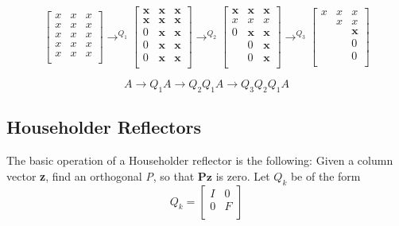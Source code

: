 \documentclass{article}
\begin{document}
$$
\left [\begin{array}{ccc}
x & x & x \\
x & x & x \\
x & x & x \\
x & x & x \\
x & x & x \\
\end{array}\right] \rightarrow^{Q_{1}} \left [\begin{array}{ccc}
\mathbf{x} & \mathbf{x} & \mathbf{x} \\
\mathbf{x} & \mathbf{x} & \mathbf{x} \\
0 & \mathbf{x} & \mathbf{x} \\
0 & \mathbf{x} & \mathbf{x} \\
0 & \mathbf{x} & \mathbf{x} \\
\end{array}\right]  \rightarrow^{Q_{2}} \left [\begin{array}{ccc}
\mathbf{x} & \mathbf{x} & \mathbf{x} \\
x & x & x \\
0 & \mathbf{x} & \mathbf{x} \\
 & 0 & \mathbf{x} \\
 & 0 & \mathbf{x} \\
\end{array}\right] \rightarrow^{Q_{3}} \left [\begin{array}{ccc}
x & x & x \\
  & x & x \\
 & & \mathbf{x} \\
 &  & 0 \\
 &  & 0 \\
\end{array}\right]
$$


$$ A \rightarrow  Q_{1}A \rightarrow Q_{2}Q_{1}A \rightarrow Q_{3}Q_{2}Q_{1}A$$


\subsection{Householder Reflectors}
The basic operation of a Householder reflector is the following: Given a column vector \textbf{z}, find an orthogonal \textit{P}, so that $\mathbf{Pz}$ is zero.
Let $Q_{k}$ be of the form
$$
Q_{k}= \left [\begin{array}{cc}
I & 0 \\
0 & F \\
\end{array}\right]
$$
\end{document}
